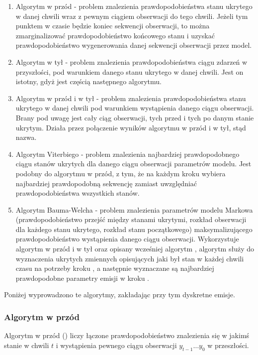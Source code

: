 \begin{enumerate}
    \item Algorytm w przód - problem znalezienia prawdopodobieństwa stanu ukrytego w danej chwili wraz z pewnym ciągiem obserwacji do tego chwili. Jeżeli tym punktem w czasie będzie koniec sekwencji obserwacji, to można zmarginalizować prawdopodobieństwo końcowego stanu i uzyskać prawdopodobieństwo wygenerowania danej sekwencji obserwacji przez model.
    \item Algorytm w tył - problem znalezienia prawdopodobieństwa ciągu zdarzeń w przyszłości, pod warunkiem danego stanu ukrytego w danej chwili. Jest on istotny, gdyż jest częścią następnego algorytmu.
    \item Algorytm w przód i w tył - problem znalezienia prawdopodobieństwa stanu ukrytego w danej chwili pod warunkiem wystąpienia danego ciągu obserwacji. Brany pod uwagę jest cały ciąg obserwacji, tych przed i tych po danym stanie ukrytym. Działa przez połączenie wyników algorytmu w przód i w tył, stąd nazwa.
    \item Algorytm Viterbiego - problem znalezienia najbardziej prawdopodobnego ciągu stanów ukrytych dla danego ciągu obserwacji parametrów modelu. Jest podobny do algorytmu w przód, z tym, że na każdym kroku wybiera najbardziej prawdopodobną sekwencję zamiast uwzględniać prawdopodobieństwa wszystkich stanów.
    \item Algorytm Bauma-Welcha - problem znalezienia parametrów modelu Markowa (prawdopodobieństwo przejść między stanami ukrytymi, rozkład obserwacji dla każdego stanu ukrytego, rozkład stanu początkowego) maksymalizującego prawdopodobieństwo wystąpienia danego ciągu obserwacji. Wykorzystuje algorytm w przód i w tył oraz opisany wcześniej algorytm , algorytm  służy do wyznaczenia ukrytych zmiennych opisujących jaki był stan w każdej chwili czasu na potrzeby kroku , a następnie wyznaczane są najbardziej prawdopodobne parametry emisji w kroku .
\end{enumerate}

Poniżej wyprowadzono te algorytmy, zakładając przy tym dyskretne emisje.

\subsubsection{Algorytm w przód}

Algorytm w przód () liczy łączone prawdopodobieństwo znalezienia się w jakimś stanie w chwili $t$
i wystąpienia pewnego ciągu obserwacji $y_{t-1} \dots y_0$ w przeszłości.

